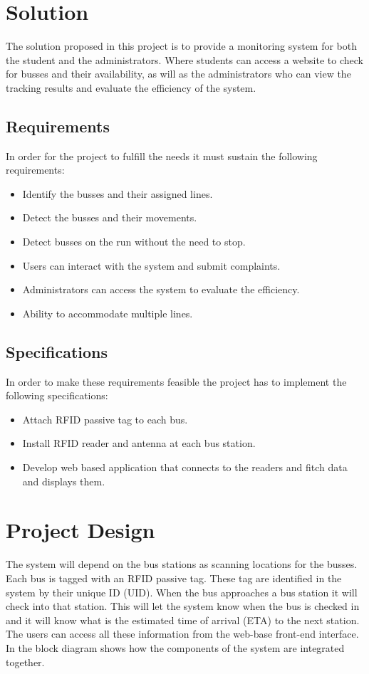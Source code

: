\documentclass[a4paper,twoside]{IEEEtran}
\begin{document}
\section{Solution}
The solution proposed in this project is to provide a monitoring system for both the student and the administrators. Where students can access a website to check for busses and their availability, as will as the administrators who can view the tracking results and evaluate the efficiency of the system.
\subsection{Requirements}
In order for the project to fulfill the needs it must sustain the following requirements:
\begin{itemize}
\item
Identify the busses and their assigned lines.
\item
Detect the busses and their movements.
\item
Detect busses on the run without the need to stop.
\item
Users can interact with the system and submit complaints.
\item
Administrators can access the system to evaluate the efficiency.
\item
Ability to accommodate multiple lines.
\end{itemize}
\subsection{Specifications}
In order to make these requirements feasible the project has to implement the following specifications:
\begin{itemize}
\item 
Attach RFID passive tag to each bus.
\item
Install RFID reader and antenna at each bus station.
\item
Develop web based application that connects to the readers and fitch data and displays them.
\end{itemize}


\section{Project Design}
The system will depend on the bus stations as scanning locations for the busses. Each bus is tagged with an RFID passive tag. These tag are identified in the system by their unique ID (UID). When the bus approaches a bus station it will check into that station. This will let the system know when the bus is checked in and it will know what is the estimated time of arrival (ETA) to the next station. The users can access all these information from the web-base front-end interface. In  the block diagram shows how the components of the system are integrated together.
\end{document}
